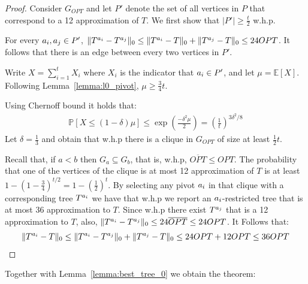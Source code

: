 \documentclass{article}
\begin{document}
\begin{proof}
Consider $G_{OPT}$ and let $P'$ denote the set of all vertices in $P$ that correspond to a 12 approximation of $T$. We first show that $|P'|\geq \frac{t}{2}$ w.h.p.

For every $a_i , a_j \in P'$, 
$\lVert T^{a_i}-T^{a_j} \rVert_0 \leq \lVert T^{a_i}-T \rVert_0 + \lVert T^{a_j}-T \rVert_0 \leq 24OPT$. It follows that there is an edge between every two vertices in $P'$. 

Write $X=\sum_{i=1}^t X_i$ where $X_i$ is the indicator that $a_i \in P'$, and let $\mu = \mathbb{E} [X]$. Following Lemma~\ref{lemma:l0_pivot}, $\mu \geq \frac{3}{4}t$. 

Using Chernoff bound it holds that:
\begin{align*}
\mathbb{P} [X \leq (1-\delta) \mu] \leq \exp (\frac{-\delta^2 \mu}{2}) = (\frac{1}{t})^{3\delta^2/8}
\end{align*}
Let $\delta = \frac{1}{3}$ and obtain that w.h.p there is a clique in $G_{OPT}$ of size at least $\frac{1}{2}t$.

Recall that, if $a<b$ then $G_a \subseteq G_b$, that is, w.h.p, $\overline{OPT} \leq OPT$.
The probability that one of the vertices of the clique is at most 12 approximation of $T$ is at least $1-(1-\frac{3}{4})^{t/2}=1-(\frac{1}{2})^t$. By selecting any pivot $a_i$ in that clique with a corresponding tree $T^{a_i}$ we have that w.h.p we report an $a_i$-restricted tree that is at most 36 approximation to $T$. Since w.h.p there exist $T^{a_j}$ that is a 12 approximation to $T$, also,
$\lVert T^{a_i}-T^{a_j} \rVert_0 \leq 24\overline{OPT} \leq 24OPT$. 
It Follows that:
\begin{align*}
\lVert T^{a_i}-T \rVert_0 \leq \lVert T^{a_i}-T^{a_j} \rVert_0 + \lVert T^{a_j}-T \rVert_0 \leq 24OPT + 12OPT \leq 36OPT
\end{align*}
\end{proof}

Together with Lemma~\ref{lemma:best_tree_0} we obtain the theorem:

\zeroreduction*
 


\end{document}
